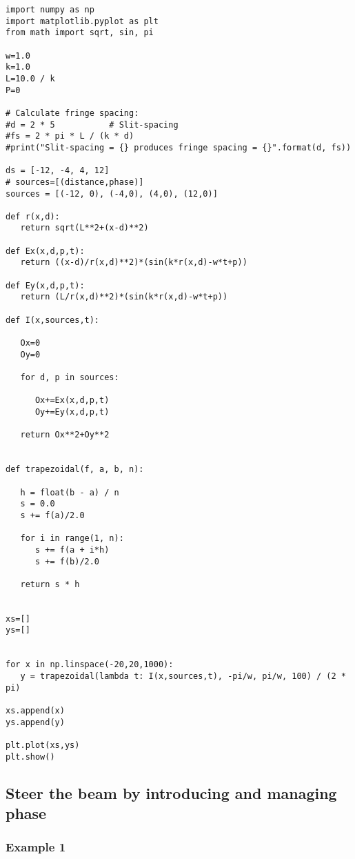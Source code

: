 \begin{Verbatim}[fontsize=\small,baselinestretch=0.9]
import numpy as np
import matplotlib.pyplot as plt
from math import sqrt, sin, pi

w=1.0
k=1.0
L=10.0 / k
P=0

# Calculate fringe spacing:
#d = 2 * 5           # Slit-spacing
#fs = 2 * pi * L / (k * d)
#print("Slit-spacing = {} produces fringe spacing = {}".format(d, fs))

ds = [-12, -4, 4, 12]
# sources=[(distance,phase)]
sources = [(-12, 0), (-4,0), (4,0), (12,0)]

def r(x,d):
   return sqrt(L**2+(x-d)**2)

def Ex(x,d,p,t):
   return ((x-d)/r(x,d)**2)*(sin(k*r(x,d)-w*t+p))

def Ey(x,d,p,t):
   return (L/r(x,d)**2)*(sin(k*r(x,d)-w*t+p))

def I(x,sources,t):

   Ox=0
   Oy=0

   for d, p in sources:

      Ox+=Ex(x,d,p,t)
      Oy+=Ey(x,d,p,t)

   return Ox**2+Oy**2


def trapezoidal(f, a, b, n):

   h = float(b - a) / n
   s = 0.0
   s += f(a)/2.0

   for i in range(1, n):
      s += f(a + i*h)
      s += f(b)/2.0

   return s * h


xs=[]
ys=[]


for x in np.linspace(-20,20,1000):
   y = trapezoidal(lambda t: I(x,sources,t), -pi/w, pi/w, 100) / (2 * pi)

xs.append(x)
ys.append(y)

plt.plot(xs,ys)
plt.show()   
\end{Verbatim}

\subsection{Steer the beam by introducing and managing phase}

\subsubsection{Example 1}

